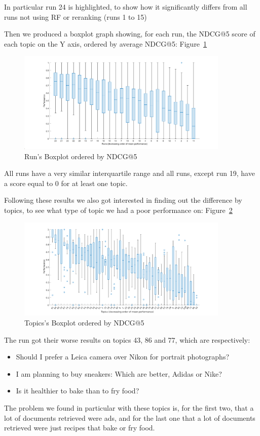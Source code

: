 In particular run 24 is highlighted, to show how it significantly differs from all runs not using RF or reranking (runs 1 to 15)

Then we produced a boxplot graph showing, for each run, the NDCG@5 score of each topic on the Y axis, ordered by average NDCG@5: Figure~\ref{fig:runs-boxplot-ordered}

\begin{figure}[h]
	\centering
	\includegraphics[width=0.9\textwidth]{figure/RunsBoxPlotOrdered.pdf}
	\caption{Run's Boxplot ordered by NDCG@5}
	\label{fig:runs-boxplot-ordered}
\end{figure}

All runs have a very similar interquartile range and all runs, except run 19, have a score equal to 0 for at least one topic.

Following these results we also got interested in finding out the difference by topics, to see what type of topic we had a poor performance on: Figure~\ref{fig:topics-boxplot-ordered}

\begin{figure}[h]
	\centering
	\includegraphics[width=0.9\textwidth]{figure/TopicsBoxPlotOrdered.pdf}
	\caption{Topics's Boxplot ordered by NDCG@5}
	\label{fig:topics-boxplot-ordered}
\end{figure}

The run got their worse results on topics 43, 86 and 77, which are respectively:
\begin{itemize}
	\item Should I prefer a Leica camera over Nikon for portrait photographs?
	\item I am planning to buy sneakers: Which are better, Adidas or Nike?
	\item Is it healthier to bake than to fry food?
\end{itemize}
The problem we found in particular with these topics is, for the first two, that a lot of documents retrieved were ads, and for the last one that a lot of documents retrieved were just recipes that bake or fry food.

